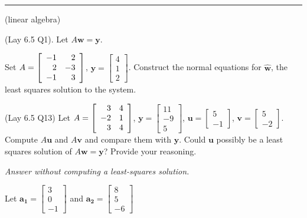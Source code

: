 \documentclass[12pt,letterpaper,noanswers]{exam}
\newcommand{\vc}[1]{\boldsymbol{#1}}
\begin{document}
 \vspace{0.2cm}
\hrule
 \vspace{0.2cm}
\begin{questions}
\question (linear algebra)
\begin{parts}
\item (Lay 6.5 Q1). Let $A\vc{w} = \vc{y}$.

Set $A = \left[\begin{array}{r r} -1 & 2 \\ 2 & -3 \\ -1 & 3\end{array}  \right]$, $\vc{y}= \left[\begin{array}{r} 4 \\ 1 \\ 2 \end{array} \right]$.  Construct the normal equations for $\hat{\vc{w}}$, the least squares solution to the system.

\item (Lay 6.5 Q13) Let $A = \left[\begin{array}{r r} 3 & 4 \\ -2 & 1 \\ 3 & 4\end{array}  \right]$, $\vc{y}= \left[\begin{array}{r} 11 \\ -9 \\ 5 \end{array} \right]$, $\vc{u}= \left[\begin{array}{r} 5 \\ -1 \end{array} \right]$, $\vc{v}= \left[\begin{array}{r} 5 \\ -2 \end{array} \right]$.  Compute $A\vc{u}$ and $A\vc{v}$ and compare them with $\vc{y}$.  Could $\vc{u}$ possibly be a least squares solution of $A\vc{w} = \vc{y}$?  Provide your reasoning.

\emph{Answer without computing a least-squares solution.}

\item Let $\vc{a_1} = \left[\begin{array}{r} 3 \\ 0 \\-1 \end{array}\right]$ and $\vc{a_2} = \left[\begin{array}{r} 8 \\ 5 \\-6 \end{array}\right]$


\end{parts}
\end{questions}
\end{document}
